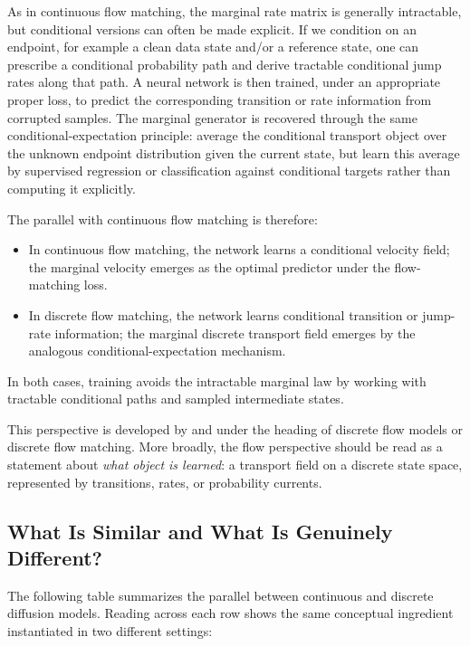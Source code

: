 As in continuous flow matching, the marginal rate matrix is generally
intractable, but conditional versions can often be made explicit.  If we
condition on an endpoint, for example a clean data state and/or a reference state, one can prescribe a conditional probability
path and derive tractable conditional jump rates along that path. A neural
network is then trained, under an appropriate proper loss, to predict the corresponding transition or rate information from corrupted
samples. The marginal generator is recovered through the same conditional-expectation principle: average the conditional transport object over the unknown endpoint distribution given the current state, but learn this average by supervised regression or classification against conditional targets rather than computing it explicitly.

The parallel with continuous flow matching is therefore:
\begin{itemize}[leftmargin=2em]
    \item In continuous flow matching, the network learns a conditional
      velocity field; the marginal velocity emerges as the optimal predictor under the flow-matching loss.
    \item In discrete flow matching, the network learns conditional
      transition or jump-rate information; the marginal discrete transport field emerges by the analogous conditional-expectation mechanism.
\end{itemize}
In both cases, training avoids the intractable marginal law by working
with tractable conditional paths and sampled intermediate states.

This perspective is developed by \citet{campbell2024generative} and
\citet{gat2024discrete} under the heading of discrete flow models or discrete flow matching. More broadly, the flow perspective should be read as a statement about \emph{what object is learned}: a transport field on a discrete state space, represented by transitions, rates, or probability currents.

\subsection{What Is Similar and What Is Genuinely Different?}
\label{subsec:epilogue-genuine-diff}

The following table summarizes the parallel between continuous and
discrete diffusion models. Reading across each row shows the same
conceptual ingredient instantiated in two different settings:

